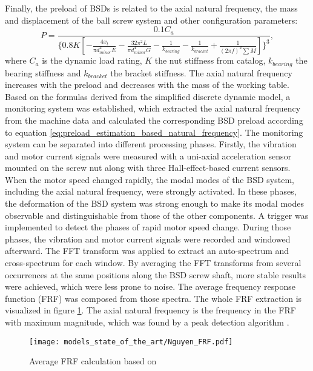 Finally, the preload of BSDs is related to the axial natural frequency, the mass and displacement of the ball screw system and other configuration parameters:
\begin{equation}
    P=\frac{0.1C_{a}}{\{0.8K[ -\frac{4x_{t}}{\pi d_{minor}^{2}E} -\frac{32\pi^{2}L}{\pi d_{minor}^{4}G}-\frac{1}{k_{bearing}}-\frac{1}{k_{bracket}}+\frac{1}{(2\pi f)^{2}\sum M} ]\}^{3}},
\label{eq:preload_estimation_based_natural_frequency}
\end{equation}
where $C_{a}$ is the dynamic load rating, $K$ the nut stiffness from catalog, $k_{bearing}$ the bearing stiffness and $k_{bracket}$ the bracket stiffness. The axial natural frequency increases with the preload and decreases with the mass of the working table. Based on the formulas derived from the simplified discrete dynamic model, a monitoring system was established, which extracted the axial natural frequency from the machine data and calculated the corresponding BSD preload according to equation \ref{eq:preload_estimation_based_natural_frequency}. The monitoring system can be separated into different processing phases. Firstly, the vibration and motor current signals were measured with a uni-axial acceleration sensor mounted on the screw nut along with three Hall-effect-based current sensors. When the motor speed changed rapidly, the modal modes of the BSD system, including the axial natural frequency, were strongly activated. In these phases, the deformation of the BSD system was strong enough to make its modal modes observable and distinguishable from those of the other components. A trigger was implemented to detect the phases of rapid motor speed change. During those phases, the vibration and motor current signals were recorded and windowed afterward. The FFT transform was applied to extract an auto-spectrum and cross-spectrum for each window. By averaging the FFT transforms from several occurrences at the same positions along the BSD screw shaft, more stable results were achieved, which were less prone to noise. The average frequency response function (FRF) was composed from those spectra. The whole FRF extraction is visualized in figure \ref{fig:Nguyen_frf}. The axial natural frequency is the frequency in the FRF with maximum magnitude, which was found by a peak detection algorithm \cite{NGUYEN2019}.

\begin{figure}[H]
  \centering
  \texttt{[image: models\_state\_of\_the\_art/Nguyen\_FRF.pdf]}
  \caption{Average FRF calculation based on \cite{NGUYEN2019}}
  \label{fig:Nguyen_frf}
\end{figure}

